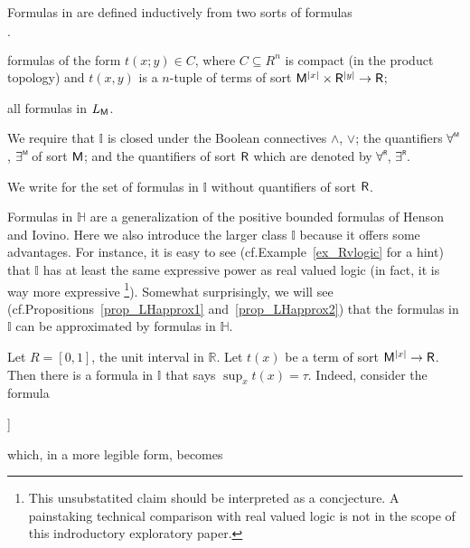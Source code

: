 \documentclass[11pt,oneside]{amsart}
\newcommand{\mylabel}[1]{{#1}\hfill}
\renewenvironment{itemize}
  {\begin{list}{$\cdot$}{%
  \setlength{\parskip}{0mm}
  \setlength{\topsep}{.2\baselineskip}
  \setlength{\rightmargin}{0mm}
  \setlength{\listparindent}{0mm}
  \setlength{\itemindent}{0mm}
  \setlength{\labelwidth}{3ex}
  \setlength{\itemsep}{.2\baselineskip}
  \setlength{\parsep}{.2\baselineskip}
  \setlength{\partopsep}{0mm}
  \setlength{\labelsep}{1ex}
  \setlength{\leftmargin}{\labelwidth+\labelsep}
  \let\makelabel\mylabel}}{%
\end{list}}
\renewcommand*{\emph}[1]{%
   \smash{\tikz[baseline]\node[rectangle, fill=teal!25, rounded corners, inner xsep=0.5ex, inner ysep=0.2ex, anchor=base, minimum height = 2.7ex]{#1};}}
\begin{document}
\begin{definition}\label{def_LL}
  Formulas in \emph{$\mathds{I}$\/} are defined inductively from two sorts of \emph{$\mathds{I}$-atomic\/} formulas
  \begin{itemize}
  \item[i.] formulas of the form $t(x;y)\in C$, where $C\subseteq R^n$ is compact (in the product topology) and $t(x,y)$ is a $n$-tuple of terms of sort ${\sf M}^{|x|}\times {\sf R}^{|y|}\to {\sf R}$; 
  \item[ii.] all formulas in $L_{\sf M}$.
  \end{itemize}
  We require that $\mathds{I}$ is closed under the Boolean connectives $\wedge$, $\vee$; the quantifiers $\forallM$, $\existsM $ of sort ${\sf M}$; and the quantifiers of sort ${\sf R}$ which are denoted by $\forallR $, $\existsR$.

  We write \emph{$\mathds{H}$ \/} for the set of formulas in $\mathds{I}$ without quantifiers of sort ${\sf R}$.
\end{definition}

Formulas in $\mathds{H}$ are a generalization of the positive bounded formulas of Henson and Iovino.
Here we also introduce the larger class $\mathds{I}$ because it offers some advantages. 
For instance, it is easy to see (cf.\@ Example~\ref{ex_Rvlogic} for a hint) that $\mathds{I}$ has at least the same expressive power as real valued logic (in fact, it is way more expressive%
\footnote{This unsubstatited claim should be interpreted as a concjecture.
A painstaking technical comparison with real valued logic is not in the scope of this indroductory exploratory paper.}).
Somewhat surprisingly, we will see (cf.\@ Propositions~\ref{prop_LHapprox1} and~\ref{prop_LHapprox2}) that the formulas in $\mathds{I}$ can be approximated by formulas in $\mathds{H}$.

\begin{example}\label{ex_Rvlogic}
  Let $R=[0,1]$, the unit interval in $\mathds{R}$.
  Let $t(x)$ be a term of sort ${\sf M}^{|x|}\to {\sf R}$.
  Then there is a formula in $\mathds{I}$ that says $\sup_{x} t(x)=\tau$.
  Indeed, consider the formula

  {\wedge}{\forallR \varepsilon \Big[\varepsilon\in\{0\}\ \vee\ \existsM x\ \big[\tau\dotminus (t(x)+\varepsilon)\in\{0\}\big]\Big]}

  which, in a more legible form, becomes

\end{example}
\end{document}
